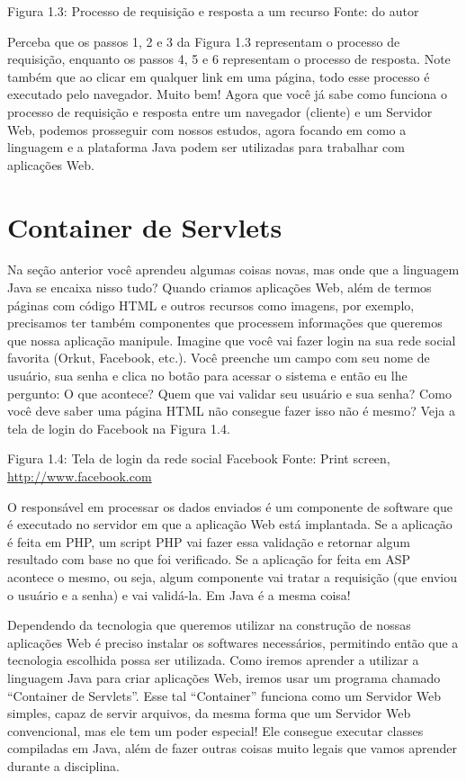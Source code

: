 Figura 1.3: Processo de requisição e resposta a um recurso
Fonte: do autor

Perceba que os passos 1, 2 e 3 da Figura 1.3 representam o processo de requisição, enquanto os passos 4, 5 e 6 representam o processo de resposta. Note também que ao clicar em qualquer link em uma página, todo esse processo é executado pelo navegador.
Muito bem! Agora que você já sabe como funciona o processo de requisição e resposta entre um navegador (cliente) e um Servidor Web, podemos prosseguir com nossos estudos, agora focando em como a linguagem e a plataforma Java podem ser utilizadas para trabalhar com aplicações Web.


\section{Container de Servlets}

Na seção anterior você aprendeu algumas coisas novas, mas onde que a linguagem Java se encaixa nisso tudo? Quando criamos aplicações Web, além de termos páginas com código HTML e outros recursos como imagens, por exemplo, precisamos ter também componentes que processem informações que queremos que nossa aplicação manipule. Imagine que você vai fazer login na sua rede social favorita (Orkut, Facebook, etc.). Você preenche um campo com seu nome de usuário, sua senha e clica no botão para acessar o sistema e então eu lhe pergunto: O que acontece? Quem que vai validar seu usuário e sua senha? Como você deve saber uma página HTML não consegue fazer isso não é mesmo? Veja a tela de login do Facebook na Figura 1.4.

Figura 1.4: Tela de login da rede social Facebook
Fonte: Print screen, \url{http://www.facebook.com}

O responsável em processar os dados enviados é um componente de software que é executado no servidor em que a aplicação Web está implantada. Se a aplicação é feita em PHP, um script PHP vai fazer essa validação e retornar algum resultado com base no que foi verificado. Se a aplicação for feita em ASP acontece o mesmo, ou seja, algum componente vai tratar a requisição (que enviou o usuário e a senha) e vai validá-la. Em Java é a mesma coisa!

Dependendo da tecnologia que queremos utilizar na construção de nossas aplicações Web é preciso instalar os softwares necessários, permitindo então que a tecnologia escolhida possa ser utilizada. Como iremos aprender a utilizar a linguagem Java para criar aplicações Web, iremos usar um programa chamado ``Container de Servlets''. Esse tal ``Container'' funciona como um Servidor Web simples, capaz de servir arquivos, da mesma forma que um Servidor Web convencional, mas ele tem um poder especial! Ele consegue executar classes compiladas em Java, além de fazer outras coisas muito legais que vamos aprender durante a disciplina.

